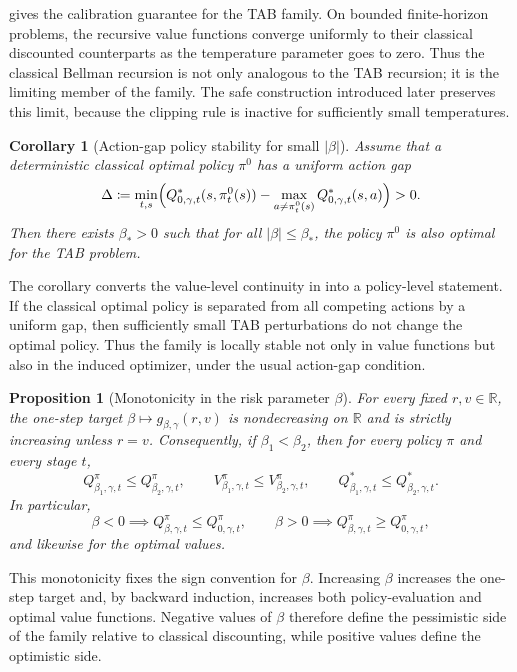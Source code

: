 \documentclass{article}
\newtheorem{proposition}[proposition]{Proposition}
\newtheorem{corollary}[corollary]{Corollary}
\theoremstyle{remark}
\newcommand{\R}{\mathbb{R}}
\newcommand{\defeq}{\coloneqq}
\newcommand{\gbg}{g_{\beta,\gamma}}
\begin{document}
 gives the calibration guarantee for the TAB family. On bounded
finite-horizon problems, the recursive value functions converge uniformly to their classical discounted
counterparts as the temperature parameter goes to zero. Thus the classical Bellman recursion is not
only analogous to the TAB recursion; it is the limiting member of the family. The safe construction
introduced later preserves this limit, because the clipping rule is inactive for sufficiently small
temperatures.

\begin{corollary}[Action-gap policy stability for small $|\beta|$]
\label{cor:small-beta-policy-stability}
Assume that a deterministic classical optimal policy $\pi^0$ has a uniform action gap
\[
\Delta
\defeq
\min_{t,s}
\Bigl(
Q^*_{0,\gamma,t}(s,\pi_t^0(s))
-
\max_{a\neq \pi_t^0(s)}Q^*_{0,\gamma,t}(s,a)
\Bigr)
>0.
\]
Then there exists $\beta_*>0$ such that for all $|\beta|\le \beta_*$, the policy $\pi^0$ is also
optimal for the TAB problem.
\end{corollary}

The corollary converts the value-level continuity in  into a policy-level
statement. If the classical optimal policy is separated from all competing actions by a uniform gap,
then sufficiently small TAB perturbations do not change the optimal policy. Thus the family is
locally stable not only in value functions but also in the induced optimizer, under the usual
action-gap condition.

\begin{proposition}[Monotonicity in the risk parameter $\beta$]
\label{prop:beta-monotone}
For every fixed $r,v\in\R$, the one-step target $\beta\mapsto \gbg(r,v)$ is nondecreasing on
$\R$ and is strictly increasing unless $r=v$. Consequently, if $\beta_1<\beta_2$, then for every
policy $\pi$ and every stage $t$,
\[
Q_{\beta_1,\gamma,t}^\pi \le Q_{\beta_2,\gamma,t}^\pi,
\qquad
V_{\beta_1,\gamma,t}^\pi \le V_{\beta_2,\gamma,t}^\pi,
\qquad
Q_{\beta_1,\gamma,t}^* \le Q_{\beta_2,\gamma,t}^*.
\]
In particular,
\[
\beta<0 \implies Q_{\beta,\gamma,t}^\pi \le Q_{0,\gamma,t}^\pi,
\qquad
\beta>0 \implies Q_{\beta,\gamma,t}^\pi \ge Q_{0,\gamma,t}^\pi,
\]
and likewise for the optimal values.
\end{proposition}

This monotonicity fixes the sign convention for $\beta$. Increasing $\beta$ increases the one-step
target and, by backward induction, increases both policy-evaluation and optimal value functions.
Negative values of $\beta$ therefore define the pessimistic side of the family relative to classical
discounting, while positive values define the optimistic side.
\end{document}
